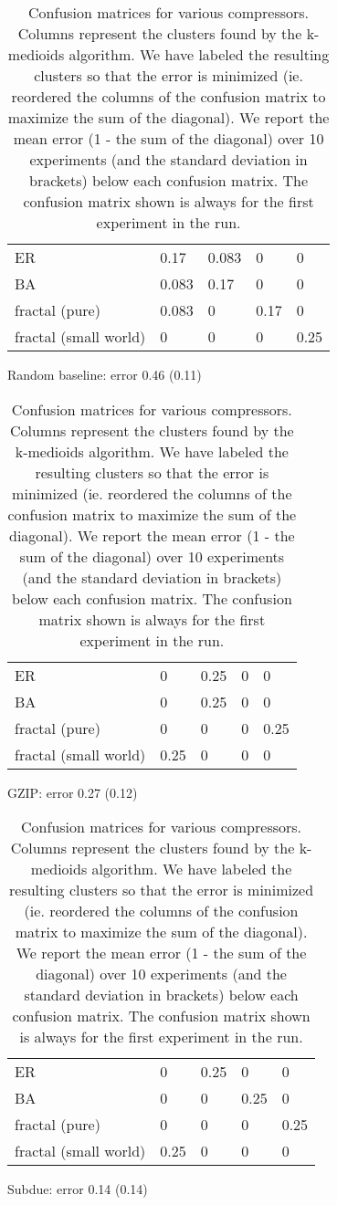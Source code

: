\documentclass{article}
\begin{document}
\begin{table}[h]

\begin{subfigure}[b]{1\columnwidth}
\begin{tabular}{l |  l l l l}
\hline
  ER                    &  0.17  & 0.083   & 0     & 0 \\
  BA                    &  0.083 & 0.17    & 0     & 0 \\
  fractal (pure)        &  0.083 & 0       & 0.17  & 0 \\
  fractal (small world) &  0     & 0       & 0     & 0.25 \\
\hline
\end{tabular}
\caption{Random baseline: error 0.46 (0.11)}
\end{subfigure}
\vspace{3mm}

\begin{subfigure}[b]{1\columnwidth}
\begin{tabular}{l |   l l l l}
\hline
  ER                    &  0    & 0.25 & 0 & 0 \\
  BA                    &  0    & 0.25 & 0 & 0 \\
  fractal (pure)        &  0    & 0    & 0 & 0.25 \\
  fractal (small world) &  0.25 & 0    & 0 & 0 \\
\hline
\end{tabular}
\caption{GZIP: error 0.27 (0.12)}
\end{subfigure}
\vspace{3mm}

\begin{subfigure}[b]{1\columnwidth}
\begin{tabular}{l |  l l l l}
\hline
  ER                    &  0    & 0.25 & 0    & 0    \\
  BA                    &  0    & 0    & 0.25 & 0    \\
  fractal (pure)        &  0    & 0    & 0    & 0.25 \\
  fractal (small world) &  0.25 & 0    & 0    & 0    \\
\hline
\end{tabular}
\caption{Subdue: error 0.14 (0.14)}
\end{subfigure}
\caption{Confusion matrices for various compressors. Columns represent the clusters found by the k-medioids algorithm. We have labeled the resulting clusters so that the error is minimized (ie. reordered the columns of the confusion matrix to maximize the sum of the diagonal). We report the mean error (1 - the sum of the diagonal) over 10 experiments (and the standard deviation in brackets) below each confusion matrix. The confusion matrix shown is always for the first experiment in the run.}
\label{table:synthetic-large}
\end{table}
\end{document}

